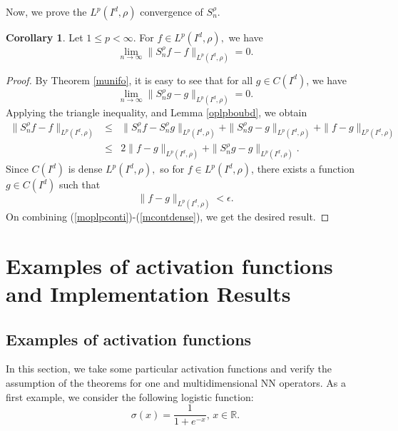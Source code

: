 \documentclass[12pt, reqno]{amsart}
\numberwithin{equation}{section}
\theoremstyle{definition}
\newtheorem{corollary}[theorem]{Corollary}
\theoremstyle{remark}
\numberwithin{equation}{section}
\newcommand{\R}{\mathbb{R}}
\newcommand{\LP}{L^p(I^d, \rho)}
\begin{document}
Now, we prove the $\LP$ convergence of $S^{\rho}_n.$
 \begin{corollary} \label{moplpcon}
    Let $1\leq p<\infty.$ For $f\in \LP,$ we have
$$\lim_{n\to\infty}\|S^{\rho}_nf-f\|_{\LP}=0.$$
\end{corollary}
\begin{proof} By Theorem \ref{munifo}, it is easy to see that for all $g\in C(I^d)$, we have 
\begin{equation} \lim_{n\to\infty}\|S^{\rho}_ng-g\|_{\LP}=0.  \label{moplpconti}\end{equation}
Applying the triangle inequality, and Lemma \ref{oplpboubd}, we obtain 
   \begin{eqnarray*} 
    \|S^{\rho}_nf-f\|_{\LP} 
    &\leq&  \|S^{\rho}_nf-S^{\rho}_ng\|_{\LP}+ \|S^{\rho}_ng-g\|_{\LP} + \|f-g\|_{\LP}\\
    &\leq& 2\|f-g\|_{\LP} + \|S^{\rho}_ng-g\|_{\LP}.
   \end{eqnarray*}
   Since $C(I^d)$ is dense $\LP,$ so for $f\in \LP$, there exists a function $g\in C(I^d)$ such that 
  \begin{equation} \|f-g\|_{\LP}<\epsilon. \label{mcontdense}\end{equation}
 On combining (\ref{moplpconti})-(\ref{mcontdense}), we get the desired result.
\end{proof}





\section{Examples of activation functions and Implementation Results}
\subsection{Examples of activation functions}
\label{example}
In this section, we take some particular activation functions and verify the assumption of the theorems for one and multidimensional NN operators. As a first example, we consider the following logistic function: $$\sigma(x)=\dfrac{1}{1+e^{-x}},\, x\in \R.$$
\end{document}
